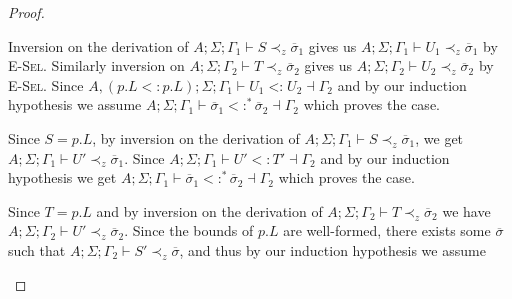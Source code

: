 \documentclass{llncs}
\numberwithin{subcase}{casethm}
\numberwithin{casethm}{theorem}
\numberwithin{casethm}{lemma}
\begin{document}
\begin{proof}
\begin{casethm}
Inversion on the derivation of $A; \Sigma; \Gamma_1 \vdash S \prec_z \overline{\sigma}_1$ 
gives us $A; \Sigma; \Gamma_1 \vdash U_1 \prec_z \overline{\sigma}_1$ by \textsc{E-Sel}.
Similarly inversion on 
$A; \Sigma; \Gamma_2 \vdash T \prec_z \overline{\sigma}_2$
gives us $A; \Sigma; \Gamma_2 \vdash U_2 \prec_z \overline{\sigma}_2$ by \textsc{E-Sel}.
Since $A, (p.L <: p.L); \Sigma; \Gamma_1 \vdash U_1 \; \texttt{<:}\; U_2 \dashv \Gamma_2$
and by our induction hypothesis we assume
$A; \Sigma; \Gamma_1 \vdash \overline{\sigma}_1 <:^* \overline{\sigma}_2 \dashv \Gamma_2$ 
which proves the case.
\end{casethm}
\begin{casethm}
Since $S = p.L$, by inversion on the derivation of 
$A; \Sigma; \Gamma_1 \vdash S \prec_z \overline{\sigma}_1$, 
we get $A; \Sigma; \Gamma_1 \vdash U' \prec_z \overline{\sigma}_1$.
Since $A; \Sigma; \Gamma_1 \vdash U' <: T' \dashv \Gamma_2$ 
and by our induction hypothesis we get 
$A; \Sigma; \Gamma_1 \vdash \overline{\sigma}_1 <:^* \overline{\sigma}_2 \dashv \Gamma_2$ 
which proves the case.
\end{casethm}
\begin{casethm}
Since $T = p.L$ and by inversion on the derivation of 
$A; \Sigma; \Gamma_2 \vdash T \prec_z \overline{\sigma}_2$ 
we have $A; \Sigma; \Gamma_2 \vdash U' \prec_z \overline{\sigma}_2$.
Since the bounds of $p.L$ are well-formed, there exists 
some $\overline{\sigma}$ such that 
$A; \Sigma; \Gamma_2 \vdash S' \prec_z \overline{\sigma}$, and 
thus by our induction hypothesis we assume 

\end{casethm}
\end{proof}
\end{document}
